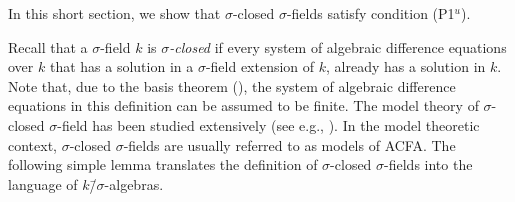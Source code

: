 \documentclass[oneside,reqno]{amsart}
\theoremstyle{definition}
\newcommand{\s}{\sigma}
\newcommand{\ks}{$k$\=/$\s$}
\begin{document}
In this short section, we show that $\s$-closed $\s$-fields satisfy condition (P1$^u$).

Recall that a $\s$-field $k$ is \emph{$\s$-closed} if every system of algebraic difference equations over $k$ that has a solution in a $\s$-field extension of $k$, already has a solution in $k$. Note that, due to the basis theorem (\cite[Theorem 2.5.11]{Levin:difference}), the system of algebraic difference equations in this definition can be assumed to be finite. The model theory of $\s$-closed $\s$-field has been studied extensively (see e.g., \cite{ChatzidakisHrushovski:ModelTheoryOfDifferenceFields}). In the model theoretic context, $\s$-closed $\s$-fields are usually referred to as models of ACFA. The following simple lemma translates the definition of $\s$-closed $\s$-fields into the language of \ks-algebras.
\end{document}
